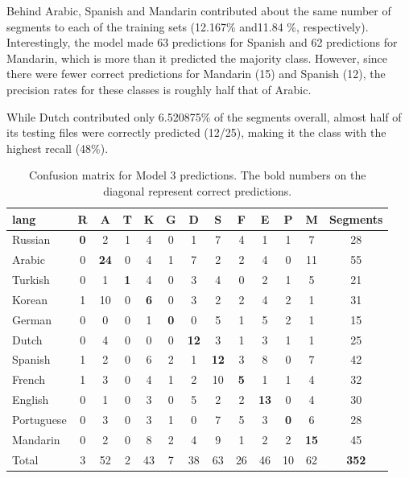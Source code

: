 \documentclass[11pt, letterpaper]{article}
\begin{document}
Behind Arabic, Spanish and Mandarin contributed about the same number of segments to each of the training sets (12.167\% and11.84 \%, respectively). Interestingly, the model made 63 predictions for Spanish and 62 predictions  for Mandarin, which is more than it predicted the majority class. However, since there were fewer correct predictions for Mandarin (15) and Spanish (12), the precision rates for these classes is roughly half that of Arabic.

While Dutch contributed only 6.520875\% of the segments overall, almost half of its testing files were correctly predicted (12/25), making it the class with the highest recall (48\%).

\begin{table}
\begin{center}
\caption{Confusion matrix for Model 3 predictions. The bold numbers on the diagonal represent correct predictions.}
\begin{tabular}{l | c c c c c c c c c c c || c}
lang			&R &A &T &K &G &D &S &F &E &P &M & Segments\\ \hline
Russian		&\textbf{0}  &2  &1  &4  &0  &1  &7  &4  &1  &1  &7 &28\\
Arabic		&0 &\textbf{24}  &0  &4  &1  &7  &2  &2  &4  &0 &11 &55\\
Turkish		&0  &1  &\textbf{1}  &4  &0  &3  &4  &0   &2  &1  &5 &21\\
Korean		&1 &10  &0  &\textbf{6}  &0  &3  &2  &2  &4  &2  &1 &31\\
German		&0  &0  &0  &1  &\textbf{0}  &0  &5  &1  &5  &2  &1 &15\\
Dutch		&0  &4  &0  &0  &0 &\textbf{12} & 3  &1  &3  &1  &1 &25\\
Spanish		&1  &2  &0  &6  &2  &1 &\textbf{12}  &3  &8  &0  &7 &42\\
French		&1  &3  &0  &4  &1  &2 &10 & \textbf{5}  &1  &1  &4 &32\\
English		&0  &1  &0  &3  &0  &5  &2  &2 &\textbf{13}  &0  &4 &30\\
Portuguese	&0  &3  &0  &3  &1  &0  &7  &5  &3  &\textbf{0}  &6 &28\\
Mandarin		&0  &2 & 0  &8  &2  &4  &9  &1  &2  &2 &\textbf{15} &45\\ \hline
Total			&3 &52 &2 &43 &7 &38 &63 &26 &46 &10 &62 &\textbf{352}\\

\end{tabular}
\label{tab:LangConfMat}
\end{center}
\end{table}
\end{document}
